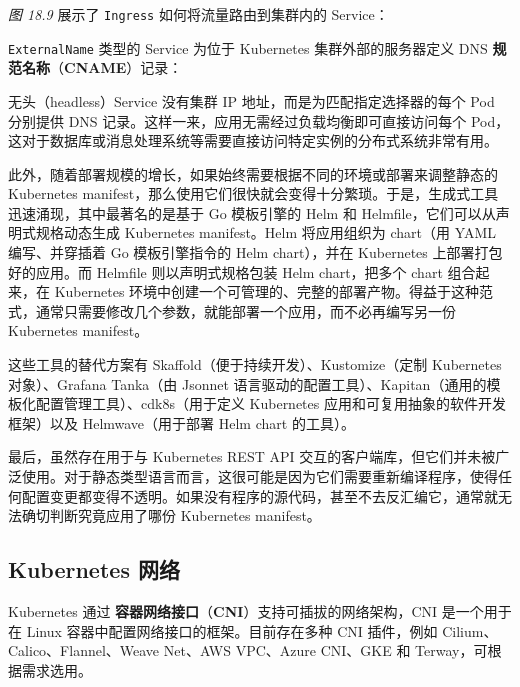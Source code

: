 \label{idx:1985}
\emph{图 18.9} 展示了 \texttt{Ingress} 如何将流量路由到集群内的 Service：


\texttt{External\allowbreak{}Name} 类型的 Service 为位于 Kubernetes 集群外部的服务器定义 DNS \textbf{规范名称}（\textbf{CNAME}）记录：


\label{idx:1986}
无头（headless）Service 没有集群 IP 地址，而是为匹配指定选择器的每个 Pod 分别提供 DNS 记录。这样一来，应用无需经过负载均衡即可直接访问每个 Pod，这对于数据库或消息处理系统等需要直接访问特定实例的分布式系统非常有用。


\label{idx:1987}
此外，随着部署规模的增长，如果始终需要根据不同的环境或部署来调整静态的 Kubernetes manifest，那么使用它们很快就会变得十分繁琐。于是，生成式工具迅速涌现，其中最著名的是基于 Go 模板引擎的 Helm 和 Helmfile，它们可以从声明式规格动态生成 Kubernetes manifest。Helm 将应用组织为 chart（用 YAML 编写、并穿插着 Go 模板引擎指令的 Helm chart），并在 Kubernetes 上部署打包好的应用。而 Helmfile 则以声明式规格包装 Helm chart，把多个 chart 组合起来，在 Kubernetes 环境中创建一个可管理的、完整的部署产物。得益于这种范式，通常只需要修改几个参数，就能部署一个应用，而不必再编写另一份 Kubernetes manifest。

这些工具的替代方案有 Skaffold（便于持续开发）、Kustomize（定制 Kubernetes 对象）、Grafana Tanka（由 Jsonnet 语言驱动的配置工具）、Kapitan（通用的模板化配置管理工具）、cdk8s（用于定义 Kubernetes 应用和可复用抽象的软件开发框架）以及 Helmwave（用于部署 Helm chart 的工具）。

\label{idx:1988}
最后，虽然存在用于与 Kubernetes REST API 交互的客户端库，但它们并未被广泛使用。对于静态类型语言而言，这很可能是因为它们需要重新编译程序，使得任何配置变更都变得不透明。如果没有程序的源代码，甚至不去反汇编它，通常就无法确切判断究竟应用了哪份 Kubernetes manifest。

\subsection{Kubernetes 网络}

\label{idx:1989}
\label{idx:1990}
\label{idx:1991}
Kubernetes 通过 \textbf{容器网络接口}（\textbf{CNI}）支持可插拔的网络架构，CNI 是一个用于在 Linux 容器中配置网络接口的框架。目前存在多种 CNI 插件，例如 Cilium、Calico、Flannel、Weave Net、AWS VPC、Azure CNI、GKE 和 Terway，可根据需求选用。


